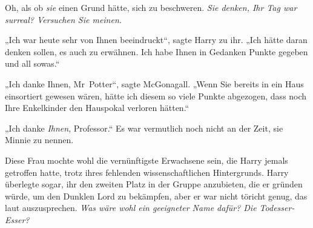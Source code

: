 Oh, als ob \emph{sie} einen Grund hätte, sich zu beschweren. \emph{Sie denken, Ihr Tag war surreal? Versuchen Sie meinen.}

„Ich war heute sehr von Ihnen beeindruckt“, sagte Harry zu ihr.
„Ich hätte daran denken sollen, es auch zu erwähnen. Ich habe Ihnen in Gedanken Punkte gegeben und all sowas.“

„Ich danke Ihnen, Mr~Potter“, sagte McGonagall.
„Wenn Sie bereits in ein Haus einsortiert gewesen wären, hätte ich diesem so viele Punkte abgezogen, dass noch Ihre Enkelkinder den Hauspokal verloren hätten.“

„Ich danke \emph{Ihnen}, Professor.“ Es war vermutlich noch nicht an der Zeit, sie Minnie zu nennen.

Diese Frau mochte wohl die vernünftigste Erwachsene sein, die Harry jemals getroffen hatte, trotz ihres fehlenden wissenschaftlichen Hintergrunds. Harry überlegte sogar, ihr den zweiten Platz in der Gruppe anzubieten, die er gründen würde, um den Dunklen Lord zu bekämpfen, aber er war nicht töricht genug, das laut auszusprechen. \emph{Was wäre wohl ein geeigneter Name dafür? Die Todesser-Esser?}

